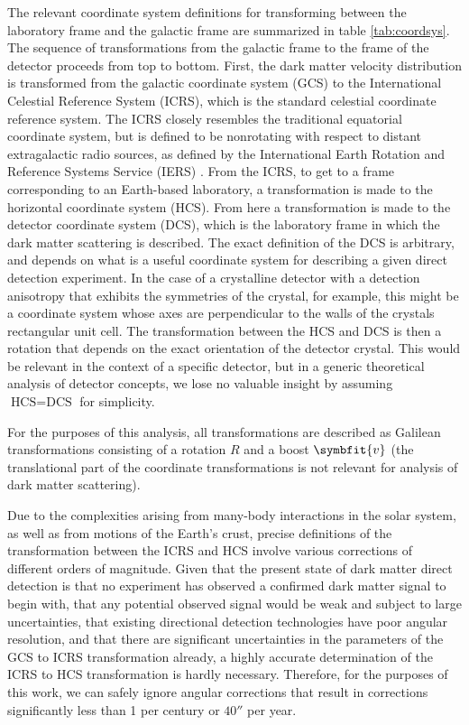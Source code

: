 \documentclass[b5paper, 10pt, twoside]{book}
\renewcommand{\vec}[1]{\symbfit{#1}}
\begin{document}
The relevant coordinate system definitions for transforming between the laboratory frame and the galactic frame are summarized in table \ref{tab:coordsys}. The sequence of transformations from the galactic frame to the frame of the detector proceeds from top to bottom. First, the dark matter velocity distribution is transformed from the galactic coordinate system (GCS) to the International Celestial Reference System (ICRS), which is the standard celestial coordinate reference system. The ICRS closely resembles the traditional equatorial coordinate system, but is defined to be nonrotating with respect to distant extragalactic radio sources, as defined by the International Earth Rotation and Reference Systems Service (IERS) \parencite{MaFeissel1997}. From the ICRS, to get to a frame corresponding to an Earth-based laboratory, a transformation is made to the horizontal coordinate system (HCS). From here a transformation is made to the detector coordinate system (DCS), which is the laboratory frame in which the dark matter scattering is described. The exact definition of the DCS is arbitrary, and depends on what is a useful coordinate system for describing a given direct detection experiment. In the case of a crystalline detector with a detection anisotropy that exhibits the symmetries of the crystal, for example, this might be a coordinate system whose axes are perpendicular to the walls of the crystals rectangular unit cell. The transformation between the HCS and DCS is then a rotation that depends on the exact orientation of the detector crystal. This would be relevant in the context of a specific detector, but in a generic theoretical analysis of detector concepts, we lose no valuable insight by assuming $\text{HCS}=\text{DCS}$ for simplicity.

For the purposes of this analysis, all transformations are described as Galilean transformations consisting of a rotation $R$ and a boost $\vec{v}$ (the translational part of the coordinate transformations is not relevant for analysis of dark matter scattering).

Due to the complexities arising from many-body interactions in the solar system, as well as from motions of the Earth's crust, precise definitions of the transformation between the ICRS and HCS involve various corrections of different orders of magnitude. Given that the present state of dark matter direct detection is that no experiment has observed a confirmed dark matter signal to begin with, that any potential observed signal would be weak and subject to large uncertainties, that existing directional detection technologies have poor angular resolution, and that there are significant uncertainties in the parameters of the GCS to ICRS transformation already, a highly accurate determination of the ICRS to HCS transformation is hardly necessary. Therefore, for the purposes of this work, we can safely ignore angular corrections that result in corrections significantly less than 1\degree{} per century or $40''$ per year.
\end{document}
